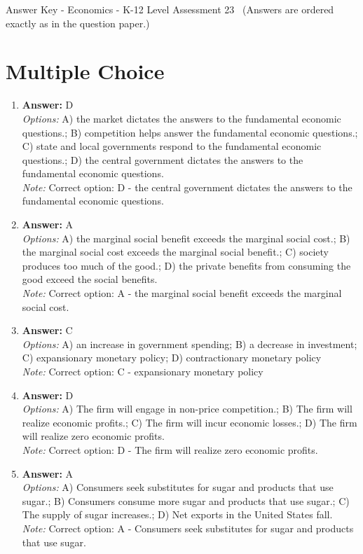 \documentclass[12pt]{article}
\begin{document}
\begin{center}
Answer Key - Economics - K-12 Level Assessment 23 \
\small (Answers are ordered exactly as in the question paper.)
\end{center}

\section*{Multiple Choice}
\begin{enumerate}[label=\arabic*.]
\item \textbf{Answer:} D
\\ \textit{Options:} A) the market dictates the answers to the fundamental economic questions.; B) competition helps answer the fundamental economic questions.; C) state and local governments respond to the fundamental economic questions.; D) the central government dictates the answers to the fundamental economic questions.
\\ \textit{Note:} Correct option: D - the central government dictates the answers to the fundamental economic questions.
\item \textbf{Answer:} A
\\ \textit{Options:} A) the marginal social benefit exceeds the marginal social cost.; B) the marginal social cost exceeds the marginal social benefit.; C) society produces too much of the good.; D) the private benefits from consuming the good exceed the social benefits.
\\ \textit{Note:} Correct option: A - the marginal social benefit exceeds the marginal social cost.
\item \textbf{Answer:} C
\\ \textit{Options:} A) an increase in government spending; B) a decrease in investment; C) expansionary monetary policy; D) contractionary monetary policy
\\ \textit{Note:} Correct option: C - expansionary monetary policy
\item \textbf{Answer:} D
\\ \textit{Options:} A) The firm will engage in non-price competition.; B) The firm will realize economic profits.; C) The firm will incur economic losses.; D) The firm will realize zero economic profits.
\\ \textit{Note:} Correct option: D - The firm will realize zero economic profits.
\item \textbf{Answer:} A
\\ \textit{Options:} A) Consumers seek substitutes for sugar and products that use sugar.; B) Consumers consume more sugar and products that use sugar.; C) The supply of sugar increases.; D) Net exports in the United States fall.
\\ \textit{Note:} Correct option: A - Consumers seek substitutes for sugar and products that use sugar.
\end{enumerate}
\end{document}
